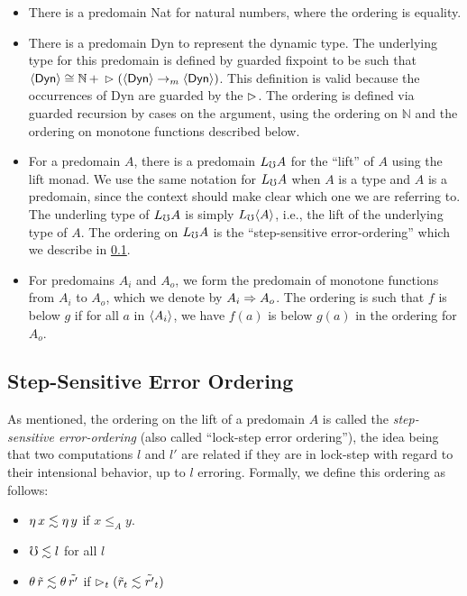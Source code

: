 \begin{itemize}
  \item There is a predomain Nat for natural numbers, where the ordering is equality.
  
  \item There is a predomain Dyn to represent the dynamic type. The underlying type
  for this predomain is defined by guarded fixpoint to be such that
  $\langle {\mathsf{Dyn}} \rangle \cong \mathbb{N}\, +\, \vartriangleright (\langle {\mathsf{Dyn}} \rangle \to_m \langle {\mathsf{Dyn}} \rangle)$.
  This definition is valid because the occurrences of Dyn are guarded by the $\vartriangleright$.
  The ordering is defined via guarded recursion by cases on the argument, using the
  ordering on $\mathbb{N}$ and the ordering on monotone functions described below.

  \item For a predomain $A$, there is a predomain $L_\mho A$ for the ``lift'' of $A$
  using the lift monad. We use the same notation for $L_\mho A$ when $A$ is a type
  and $A$ is a predomain, since the context should make clear which one we are referring to.
  The underling type of $L_\mho A$ is simply $L_\mho \langle {A} \rangle$, i.e., the lift of the underlying
  type of $A$.
  The ordering on $L_\mho A$ is the ``step-sensitive error-ordering'' which we describe in
  \ref{subsec:lock-step}.

  \item For predomains $A_i$ and $A_o$, we form the predomain of monotone functions
  from $A_i$ to $A_o$, which we denote by $A_i \Rightarrow A_o$.
  The ordering is such that $f$ is below $g$ if for all $a$ in $\langle {A_i} \rangle$, we have
  $f(a)$ is below $g(a)$ in the ordering for $A_o$. 
\end{itemize}



\subsection{Step-Sensitive Error Ordering}\label{subsec:lock-step}

As mentioned, the ordering on the lift of a predomain $A$ is called the
\emph{step-sensitive error-ordering} (also called ``lock-step error ordering''),
the idea being that two computations $l$ and $l'$ are related if they are in
lock-step with regard to their intensional behavior, up to $l$ erroring.
Formally, we define this ordering as follows:

\begin{itemize}
  \item 	$\eta\, x \lesssim \eta\, y$ if $x \le_A y$.
  \item 	$\mho \lesssim l$ for all $l$ 
  \item   $\theta\, \tilde{r} \lesssim \theta\, \tilde{r'}$ if
          $\vartriangleright_t (\tilde{r}_t \lesssim \tilde{r'}_t)$
\end{itemize}


